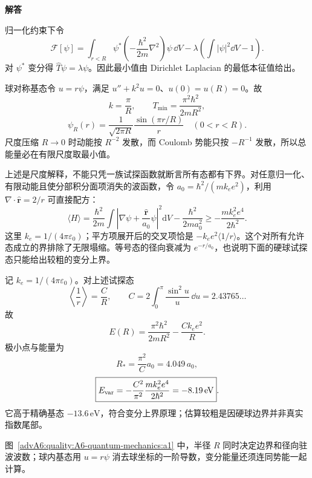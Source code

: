 \begin{advsolution}
\begin{center}\begin{minipage}{.96\linewidth}\centering
\raggedright{\bfseries\color{DeepBlue}解答}\par\smallskip\centering

\label{advA6:quality:A6-quantum-mechanics:a1}
\end{minipage}\end{center}

归一化约束下令
\[
 \mathcal F[\psi]=
 \int_{r<R}\psi^*
 \left(-\frac{\hbar^2}{2m}\nabla^2\right)\psi\,\dd V
 -\lambda\left(\int|\psi|^2\dd V-1\right).
\]
对 $\psi^*$ 变分得
$\widehat T\psi=\lambda\psi$。因此最小值由 Dirichlet Laplacian 的最低本征值给出。

球对称基态令 $u=r\psi$，满足
$u''+k^2u=0$、$u(0)=u(R)=0$。故
\[
 k=\frac\pi R,\qquad
 \boxed{T_{\min}=\frac{\pi^2\hbar^2}{2mR^2}},
\]
\[
 \boxed{\psi_R(r)=
 \frac1{\sqrt{2\pi R}}\frac{\sin(\pi r/R)}r
 \quad(0<r<R)}.
\]
尺度压缩 $R\to0$ 时动能按 $R^{-2}$ 发散，而 Coulomb 势能只按
$-R^{-1}$ 发散，所以总能量必在有限尺度取最小值。

上述是尺度解释，不能只凭一族试探函数就断言所有态都有下界。对任意归一化、有限动能且使分部积分面项消失的波函数，令 $a_0=\hbar^2/(mk_ee^2)$，利用 $\nabla\cdot\hat{\boldsymbol r}=2/r$ 可直接配方：
\[
 \langle H\rangle=
 \frac{\hbar^2}{2m}\int\left|\nabla\psi+
 \frac{\hat{\boldsymbol r}}{a_0}\psi\right|^2\mathrm dV
 -\frac{\hbar^2}{2ma_0^2}
 \ge-\frac{mk_e^2e^4}{2\hbar^2}.
\]
这里 $k_e=1/(4\pi\varepsilon_0)$；平方项展开后的交叉项恰是 $-k_ee^2\langle1/r\rangle$。这个对所有允许态成立的界排除了无限塌缩。等号态的径向衰减为 $e^{-r/a_0}$，也说明下面的硬球试探态只能给出较粗的变分上界。


记 $k_e=1/(4\pi\varepsilon_0)$。对上述试探态
\[
 \left\langle\frac1r\right\rangle
 =\frac{C}{R},\qquad
 C=2\int_0^\pi\frac{\sin^2u}{u}\,\dd u
 =2.43765\ldots
\]
故
\[
 E(R)=\frac{\pi^2\hbar^2}{2mR^2}
 -\frac{Ck_ee^2}{R}.
\]
极小点与能量为
\[
 R_*=\frac{\pi^2}{C}a_0=4.049\,a_0,
\]
\[
 \boxed{E_{\rm var}=
 -\frac{C^2}{\pi^2}\frac{mk_e^2e^4}{2\hbar^2}
 =-8.19\,\mathrm{eV}}.
\]
它高于精确基态 $-13.6\,\mathrm{eV}$，符合变分上界原理；估算较粗是因硬球边界并非真实指数尾部。

图~\ref{advA6:quality:A6-quantum-mechanics:a1} 中，半径 $R$ 同时决定边界和径向驻波波数；球内基态用 $u=r\psi$ 消去球坐标的一阶导数，变分能量还须连同势能一起计算。
\end{advsolution}

